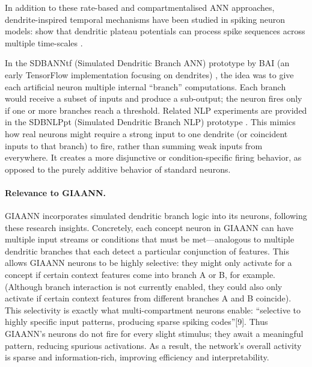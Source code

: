 In addition to these rate-based and compartmentalised ANN approaches, dendrite-inspired temporal mechanisms have been studied in spiking neuron models: \citet{leugering2023dendritic} show that dendritic plateau potentials can process spike sequences across multiple time-scales \citep{leugering2023dendritic}.

In the SDBANNtf (Simulated Dendritic Branch ANN) prototype by BAI (an early TensorFlow implementation focusing on dendrites) \citep{bairesearch2023SDBANNtf}, the idea was to give each artificial neuron multiple internal ``branch'' computations.
Each branch would receive a subset of inputs and produce a sub-output; the neuron fires only if one or more branches reach a threshold. Related NLP experiments are provided in the SDBNLPpt (Simulated Dendritic Branch NLP) prototype \citep{bairesearch2023SDBNLPpt}.
This mimics how real neurons might require a strong input to one dendrite (or coincident inputs to that branch) to fire, rather than summing weak inputs from everywhere.
It creates a more disjunctive or condition-specific firing behavior, as opposed to the purely additive behavior of standard neurons.

\paragraph{Relevance to GIAANN.}
GIAANN incorporates simulated dendritic branch logic into its neurons, following these research insights.
Concretely, each concept neuron in GIAANN can have multiple input streams or conditions that must be met---analogous to multiple dendritic branches that each detect a particular conjunction of features.
This allows GIAANN neurons to be highly selective: they might only activate for a concept if certain context features come into branch A or B, for example. (Although branch interaction is not currently enabled, they could also only activate if certain context features from different branches A and B coincide).
This selectivity is exactly what multi-compartment neurons enable: ``selective to highly specific input patterns, producing sparse spiking codes''[9].
Thus GIAANN’s neurons do not fire for every slight stimulus; they await a meaningful pattern, reducing spurious activations.
As a result, the network’s overall activity is sparse and information-rich, improving efficiency and interpretability.

